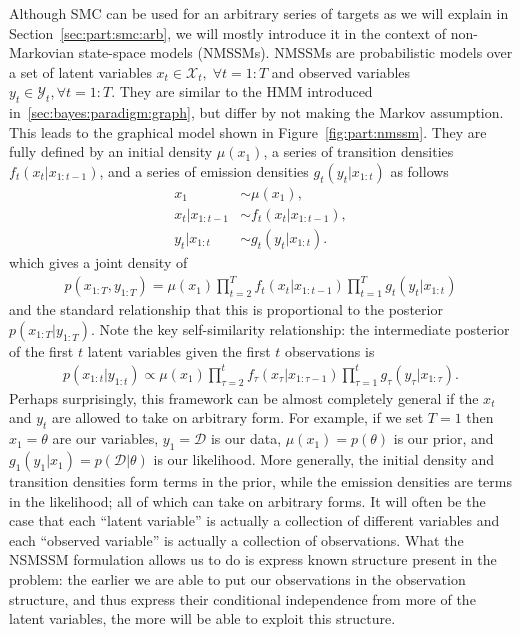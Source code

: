 Although SMC can be used for an arbitrary series of targets as we will explain
in Section~\ref{sec:part:smc:arb}, we will mostly introduce it in the context of non-Markovian state-space
models (NMSSMs).  NMSSMs are probabilistic models over a set of latent variables 
$x_t \in \mathcal{X}_t, \; \forall t = 1:T$
and observed variables $y_t \in \mathcal{Y}_t, \forall t = 1:T$.  
They are similar to
the HMM introduced in~\ref{sec:bayes:paradigm:graph}, but differ by not
making the Markov assumption.  This leads to the graphical model shown in Figure~\ref{fig:part:nmssm}.
They are fully defined by an initial density $\mu (x_1)$,
a series of transition densities $f_{t} (x_t | x_{1:t-1})$, and a series of
emission densities $g_{t} (y_t | x_{1:t})$ as follows
\begin{subequations}
\label{eq:part:ssm}
\begin{align}
x_1 &\sim \mu(x_1), \\
x_t | x_{1:t - 1} &\sim f_{t}(x_t | x_{1:t - 1}), \\
y_t | x_{1:t} &\sim g_{t}(y_t | x_{1:t}).
\end{align}
\end{subequations}
which gives a joint density of
\begin{align}
\label{eq:part:jointdistribution}
p(x_{1:T}, y_{1:T}) = \mu(x_1) \prod_{t = 2}^T f_{t}(x_t | x_{1:t - 1}) \prod_{t = 1}^T g_{t}(y_t | x_{1:t})
\end{align}
and the standard relationship that this is proportional to the posterior
$p(x_{1:T} | y_{1:T})$.  Note the
key self-similarity relationship: the intermediate posterior of the first $t$ latent variables
given the first $t$ observations is
\begin{align*}
p(x_{1:t} | y_{1:t}) \propto \mu(x_1) \prod_{\tau = 2}^t f_{\tau}(x_{\tau} | x_{1:\tau - 1}) \prod_{\tau = 1}^t g_{\tau}(y_{\tau} | x_{1:\tau}).
\end{align*}
Perhaps surprisingly, this framework can be almost completely general if the $x_t$ and $y_t$
are allowed to take on arbitrary form.  For example, if we set $T=1$ then $x_1=\theta$ are our variables,
$y_1 = \mathcal{D}$ is our data, $\mu(x_1) = p(\theta)$ is our prior, and $g_1(y_1|x_1)=p(\mathcal{D}|\theta)$
is our likelihood.  More generally, the initial density and transition densities form terms in the
prior, while the emission densities are terms in the likelihood; all of which can take on arbitrary forms.
It will often be the case that each ``latent variable'' is actually a collection of different variables and
each ``observed variable'' is actually a collection of observations.
What the NSMSSM formulation allows us to do is express known structure present in the problem: 
the earlier we are able to put our observations in the observation structure, and thus express their conditional
independence from more of the latent variables, the more will be able to exploit this structure.

